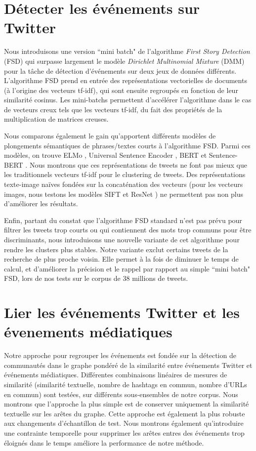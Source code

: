 \section*{Détecter les événements sur Twitter}
Nous introduisons une version ``mini batch" de l'algorithme \textit{First Story Detection} (FSD) \citep{allan_introduction_2002} qui surpasse largement le modèle \textit{Dirichlet Multinomial Mixture }(DMM) \citep{yin_dirichlet_2014} pour la tâche de détection d'événements sur deux jeux de données différents. L'algorithme FSD prend en entrée des représentations vectorielles de documents (à l'origine des vecteurs tf-idf), qui sont ensuite regroupés en fonction de leur similarité cosinus. Les mini-batchs permettent d'accélérer l'algorithme dans le cas de vecteurs creux tels que les vecteurs tf-idf, du fait des propriétés de la multiplication de matrices creuses. 

Nous comparons également le gain qu'apportent différents modèles de plongements sémantiques de phrases/textes courts à l'algorithme FSD. Parmi ces modèles, on trouve ELMo \citep{peters2018deep}, Universal Sentence Encoder \citep{cer2018universal}, BERT \citep{devlin2018bert} et Sentence-BERT \citep{reimers_2019_sentence}. Nous montrons que ces représentations de tweets ne font pas mieux que les traditionnels vecteurs tf-idf pour le clustering de tweets. Des représentations texte-image naïves fondées sur la concaténation des vecteurs (pour les vecteurs images, nous testons les modèles SIFT \citep{lowe1999object} et ResNet \citep{he2016deep}) ne permettent pas non plus d'améliorer les résultats.

Enfin, partant du constat que l'algorithme FSD standard n'est pas prévu pour filtrer les tweets trop courts ou qui contiennent des mots trop communs pour être discriminants, nous introduisons une nouvelle variante de cet algorithme pour rendre les clusters plus stables. Notre variante exclut certains tweets de la recherche de plus proche voisin. Elle permet à la fois de diminuer le temps de calcul, et d'améliorer la précision et le rappel par rapport au simple ``mini batch" FSD, lors de nos tests sur le corpus de 38 millions de tweets.

\section*{Lier les événements Twitter et les évenements médiatiques}

Notre approche pour regrouper les événements est fondée sur la détection de communautés dans le graphe pondéré de la similarité entre événements Twitter et événements médiatiques. Différentes combinaisons linéaires de mesures de similarité (similarité textuelle, nombre de hashtags en commun, nombre d'URLs en commun) sont testées, sur différents sous-ensembles de notre corpus. Nous montrons que l'approche la plus simple est de conserver uniquement la similarité textuelle sur les arêtes du graphe. Cette approche est également la plus robuste aux changements d'échantillon de test. Nous montrons également qu'introduire une contrainte temporelle pour supprimer les arêtes entres des événements trop éloignés dans le temps améliore la performance de notre méthode.

